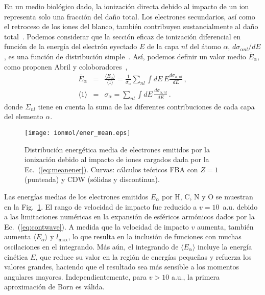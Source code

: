 En un medio biológico dado, la ionización directa debido al impacto de un 
ion representa solo una fracción del daño total. Los electrones 
secundarios, así como el retroceso de los iones del blanco, también 
contribuyen sustancialmente al daño total~\cite{Denifl:11}. Podemos 
considerar que la sección eficaz de ionización diferencial en función de 
la energía del electrón eyectado $E$ de la capa $nl$ del átomo $\alpha$,
$d\sigma_{\alpha nl}/dE$, es una función de distribución 
simple~\cite{surdutovic2018}. Así, podemos definir un valor medio 
$\overline{E}_{\alpha}$, como proponen Abril y 
coloboradores~\cite{abril2015},
\begin{eqnarray}
\overline{E}_{\alpha} &=&\frac{\langle E_{\alpha}\rangle}{\langle
1\rangle}=\frac{1}{\sigma_{\alpha}}\sum\limits_{nl}\int dE\,E
\frac{d\sigma_{\alpha,nl}}{dE}\,,  
\label{eq:meanener} \\
\langle 1\rangle &=&\sigma_{\alpha}=\sum\limits_{nl}\int dE\,
\frac{d\sigma_{\alpha,nl}}{dE}\,. 
\label{eq:normener}
\end{eqnarray}
donde $\Sigma_{nl}$ tiene en cuenta la suma de las diferentes 
contribuciones de cada capa del elemento $\alpha$.

\begin{figure}
\centering
\texttt{[image: ionmol/ener\_mean.eps]}
\caption[Distribución energética media de electrones emitidos.]
{Distribución energética media de electrones emitidos por la ionización 
debido al impacto de iones cargados dada por la Ec.~(\ref{eq:meanener}). 
Curvas: cálculos teóricos FBA con $Z=1$ (punteada) y CDW (sólidas y 
discontinua).}
\label{fig:emittedener}
\end{figure} 

Las energías medias de los electrones emitidos $\overline{E}_{\alpha}$ 
por H, C, N y O se muestran en la Fig.~\ref{fig:emittedener}. El rango 
de velocidad de impacto fue reducido a $v=10$~a.u. debido a las 
limitaciones numéricas en la expansión de esféricos armónicos dados por 
la Ec.~(\ref{eq:contwave}). A medida que la velocidad de impacto $v$ 
aumenta, también aumenta $\langle E_{\alpha}\rangle$ y $l_{\max}$, lo que 
resulta en la inclusión de funciones con muchas oscilaciones en el 
integrando. Más aún, el integrando de $\langle E_{\alpha}\rangle$ incluye 
la energía cinética $E$, que reduce su valor en la región de energías 
pequeñas y refuerza los valores grandes, haciendo que el resultado sea 
más sensible a los momentos angulares mayores. Independientemente, para 
$v>10$ a.u., la primera aproximación de Born es válida. 

